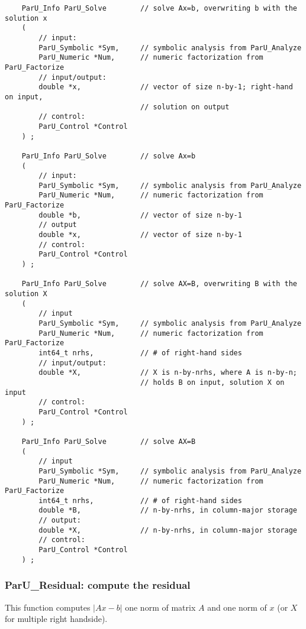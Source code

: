 \documentclass[12pt]{article}
\begin{document}
    {\footnotesize
    \begin{verbatim}
    ParU_Info ParU_Solve        // solve Ax=b, overwriting b with the solution x
    (
        // input:
        ParU_Symbolic *Sym,     // symbolic analysis from ParU_Analyze
        ParU_Numeric *Num,      // numeric factorization from ParU_Factorize
        // input/output:
        double *x,              // vector of size n-by-1; right-hand on input,
                                // solution on output
        // control:
        ParU_Control *Control
    ) ;

    ParU_Info ParU_Solve        // solve Ax=b
    (
        // input:
        ParU_Symbolic *Sym,     // symbolic analysis from ParU_Analyze
        ParU_Numeric *Num,      // numeric factorization from ParU_Factorize
        double *b,              // vector of size n-by-1
        // output
        double *x,              // vector of size n-by-1
        // control:
        ParU_Control *Control
    ) ;

    ParU_Info ParU_Solve        // solve AX=B, overwriting B with the solution X
    (
        // input
        ParU_Symbolic *Sym,     // symbolic analysis from ParU_Analyze
        ParU_Numeric *Num,      // numeric factorization from ParU_Factorize
        int64_t nrhs,           // # of right-hand sides
        // input/output:
        double *X,              // X is n-by-nrhs, where A is n-by-n;
                                // holds B on input, solution X on input
        // control:
        ParU_Control *Control
    ) ;

    ParU_Info ParU_Solve        // solve AX=B
    (
        // input
        ParU_Symbolic *Sym,     // symbolic analysis from ParU_Analyze
        ParU_Numeric *Num,      // numeric factorization from ParU_Factorize
        int64_t nrhs,           // # of right-hand sides
        double *B,              // n-by-nrhs, in column-major storage
        // output:
        double *X,              // n-by-nrhs, in column-major storage
        // control:
        ParU_Control *Control
    ) ; \end{verbatim} }

\subsubsection{{\sf ParU\_Residual}: compute the residual}

        This function computes $|Ax-b|$ one norm of matrix $A$ and one norm of
        $x$ (or $X$ for multiple right handside).
\end{document}
